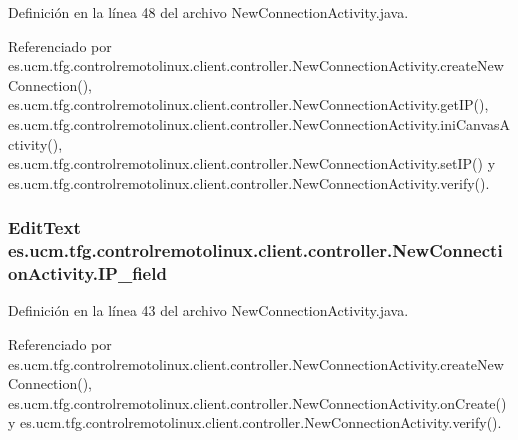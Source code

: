 Definición en la línea 48 del archivo New\-Connection\-Activity.\-java.



Referenciado por es.\-ucm.\-tfg.\-controlremotolinux.\-client.\-controller.\-New\-Connection\-Activity.\-create\-New\-Connection(), es.\-ucm.\-tfg.\-controlremotolinux.\-client.\-controller.\-New\-Connection\-Activity.\-get\-I\-P(), es.\-ucm.\-tfg.\-controlremotolinux.\-client.\-controller.\-New\-Connection\-Activity.\-ini\-Canvas\-Activity(), es.\-ucm.\-tfg.\-controlremotolinux.\-client.\-controller.\-New\-Connection\-Activity.\-set\-I\-P() y es.\-ucm.\-tfg.\-controlremotolinux.\-client.\-controller.\-New\-Connection\-Activity.\-verify().

\hypertarget{classes_1_1ucm_1_1tfg_1_1controlremotolinux_1_1client_1_1controller_1_1NewConnectionActivity_aaac9f6ca3ff657f84a9e1fdad2992958}{
\subsubsection[{I\-P\-\_\-field}]{\setlength{\rightskip}{0pt plus 5cm}Edit\-Text es.\-ucm.\-tfg.\-controlremotolinux.\-client.\-controller.\-New\-Connection\-Activity.\-I\-P\-\_\-field\hspace{0.3cm}{\ttfamily [private]}}}\label{classes_1_1ucm_1_1tfg_1_1controlremotolinux_1_1client_1_1controller_1_1NewConnectionActivity_aaac9f6ca3ff657f84a9e1fdad2992958}


Definición en la línea 43 del archivo New\-Connection\-Activity.\-java.



Referenciado por es.\-ucm.\-tfg.\-controlremotolinux.\-client.\-controller.\-New\-Connection\-Activity.\-create\-New\-Connection(), es.\-ucm.\-tfg.\-controlremotolinux.\-client.\-controller.\-New\-Connection\-Activity.\-on\-Create() y es.\-ucm.\-tfg.\-controlremotolinux.\-client.\-controller.\-New\-Connection\-Activity.\-verify().

